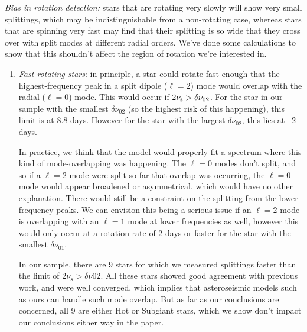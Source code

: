 \documentclass[11pt]{article}
\begin{document}
\textit{Bias in rotation detection:} stars that are rotating very slowly will show very small splittings, which may be indistinguishable from a non-rotating case, whereas stars that are spinning very fast may find that their splitting is so wide that they cross over with split modes at different radial orders. We’ve done some calculations to show that this shouldn’t affect the region of rotation we’re interested in.
\begin{enumerate}
\item \textit{Fast rotating stars}: in principle, a star could rotate fast enough that the highest-frequency peak in a split dipole ($\ell=2$) mode would overlap with the radial ($\ell=0$) mode. This would occur if $2\nu_{\rm{s}} > \delta\nu_{02}$. For the star in our sample with the smallest $\delta\nu_{02}$ (so the highest risk of this happening), this limit is at 8.8 days. However for the star with the largest $\delta\nu_{02}$, this lies at ~2 days. 

In practice, we think that the model would properly fit a spectrum where this kind of mode-overlapping was happening. The $\ell=0$ modes don’t split, and so if a $\ell=2$ mode were split so far that overlap was occurring, the $\ell=0$ mode would appear broadened or asymmetrical, which would have no other explanation. There would still be a constraint on the splitting from the lower-frequency peaks. We can envision this being a serious issue if an $\ell=2$ mode is overlapping with an $\ell=1$ mode at lower frequencies as well, however this would only occur at a rotation rate of 2 days or faster for the star with the smallest $\delta\nu_{01}$.
 
In our sample, there are 9 stars for which we measured splittings faster than the limit of $2\nu_s > \delta\nu{02}$. All these stars showed good agreement with previous work, and were well converged, which implies that asteroseismic models such as ours can handle such mode overlap. But as far as our conclusions are concerned, all 9 are either Hot or Subgiant stars, which we show don’t impact our conclusions either way in the paper.


\end{enumerate}
\end{document}
